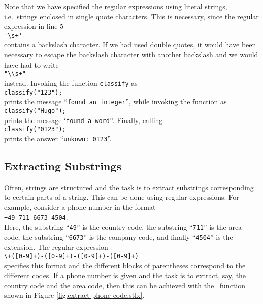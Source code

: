 Note that we have specified the regular expressions
using literal strings, i.e.~strings enclosed in single quote characters. This is necessary,
since the regular expression in line 5 \\[0.2cm]
\hspace*{1.3cm}
\verb|'\s+'|
\\[0.2cm]
contains a backslash character.  If we had used double quotes, it would have been
necessary to escape the backslash character with another backslash and we would have had
to write
\\[0.2cm]
\hspace*{1.3cm}
\verb|"\\s+"|
\\[0.2cm]
instead.  Invoking the function \texttt{classify} as 
\\[0.2cm]
\hspace*{1.3cm}
\texttt{classify("123");}
\\[0.2cm]
 prints the message ``\texttt{found an integer}'', while invoking the function as
\\[0.2cm]
\hspace*{1.3cm}
\texttt{classify("Hugo");}
\\[0.2cm]
prints the message `\texttt{found a word}''.  Finally, calling
\\[0.2cm]
\hspace*{1.3cm}
\texttt{classify("0123");}
\\[0.2cm]
prints the answer ``\texttt{unkown: 0123}''.  

\subsection{Extracting Substrings}
Often,  strings are structured and the task is to extract substrings corresponding to
certain parts of a string.  This can be done using regular expressions.  For 
example, consider a phone number in the format
\\[0.2cm]
\hspace*{1.3cm}
\texttt{+49-711-6673-4504}.
\\[0.2cm]
Here, the substring ``\texttt{49}'' is the country code, the substring ``\texttt{711}'' is
the area code, the substring ``\texttt{6673}'' is the company code, and finally
``\texttt{4504}'' is the extension.  The regular expression 
\\[0.2cm]
\hspace*{1.3cm}
\verb|\+([0-9]+)-([0-9]+)-([0-9]+)-([0-9]+)|
\\[0.2cm]
specifies this format and the different blocks of parentheses correspond to the different
codes. If  a phone number is given and the task is to
extract, say, the country code and the area code, then this can be achieved with the 
\setlx\ function shown in Figure \ref{fig:extract-phone-code.stlx}.

